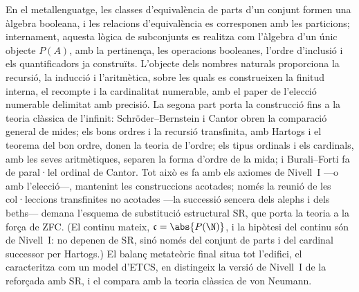 En el metallenguatge, les classes d'equivalència de parts d'un conjunt formen una àlgebra booleana, i les relacions d'equivalència es corresponen amb les particions; internament, aquesta lògica de subconjunts es realitza com l'àlgebra d'un únic objecte $P(A)$, amb la pertinença, les operacions booleanes, l'ordre d'inclusió i els quantificadors ja construïts. L'objecte dels nombres naturals proporciona la recursió, la inducció i l'aritmètica, sobre les quals es construeixen la finitud interna, el recompte i la cardinalitat numerable, amb el paper de l'elecció numerable delimitat amb precisió. La segona part porta la construcció fins a la teoria clàssica de l'infinit: Schröder--Bernstein i Cantor obren la comparació general de mides; els bons ordres i la recursió transfinita, amb Hartogs i el teorema del bon ordre, donen la teoria de l'ordre; els tipus ordinals i els cardinals, amb les seves aritmètiques, separen la forma d'ordre de la mida; i Burali--Forti fa de paral·lel ordinal de Cantor. Tot això es fa amb els axiomes de Nivell~I ---o amb l'elecció---, mantenint les construccions acotades; només la reunió de les col·leccions transfinites no acotades ---la successió sencera dels alephs i dels beths--- demana l'esquema de substitució estructural SR, que porta la teoria a la força de ZFC. (El continu mateix, $\mathfrak c=\abs{P(\N)}$, i la hipòtesi del continu són de Nivell~I: no depenen de SR, sinó només del conjunt de parts i del cardinal successor per Hartogs.) El balanç metateòric final situa tot l'edifici, el caracteritza com un model d'ETCS, en distingeix la versió de Nivell~I de la reforçada amb SR, i el compara amb la teoria clàssica de von Neumann.
